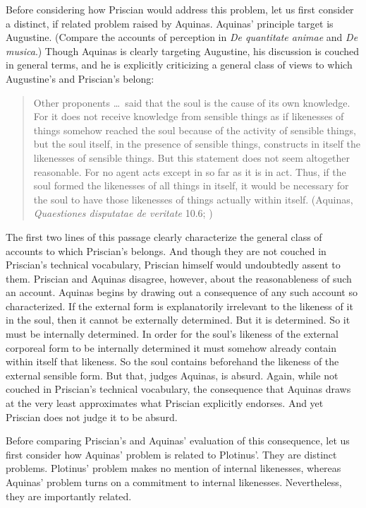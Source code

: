 \documentclass[12pt]{article}
\begin{document}
Before considering how Priscian would address this problem, let us first consider a distinct, if related problem raised by Aquinas. Aquinas' principle target is Augustine. (Compare the accounts of perception in \emph{De quantitate animae} and \emph{De musica}.) Though Aquinas is clearly targeting Augustine, his discussion is couched in general terms, and he is explicitly criticizing a general class of views to which Augustine's and Priscian's belong:
\begin{quote}
	Other proponents \ldots\ said that the soul is the cause of its own knowledge. For it does not receive knowledge from sensible things as if likenesses of things somehow reached the soul because of the activity of sensible things, but the soul itself, in the presence of sensible things, constructs in itself the likenesses of sensible things. But this statement does not seem altogether reasonable. For no agent acts except in so far as it is in act. Thus, if the soul formed the likenesses of all things in itself, it would be necessary for the soul to have those likenesses of things actually within itself. (Aquinas, \emph{Quaestiones disputatae de veritate} 10.6; \citealt[24]{James-V.-McGlynn:1953rz})
\end{quote}
The first two lines of this passage clearly characterize the general class of accounts to which Priscian's belongs. And though they are not couched in Priscian's technical vocabulary, Priscian himself would undoubtedly assent to them. Priscian and Aquinas disagree, however, about the reasonableness of such an account. Aquinas begins by drawing out a consequence of any such account so characterized. If the external form is explanatorily irrelevant to the likeness of it in the soul, then it cannot be externally determined. But it is determined. So it must be internally determined. In order for the soul's likeness of the external corporeal form to be internally determined it must somehow already contain within itself that likeness. So the soul contains beforehand the likeness of the external sensible form. But that, judges Aquinas, is absurd. Again, while not couched in Priscian's technical vocabulary, the consequence that Aquinas draws at the very least approximates what Priscian explicitly endorses. And yet Priscian does not judge it to be absurd.

Before comparing Priscian's and Aquinas' evaluation of this consequence, let us first consider how Aquinas' problem is related to Plotinus'. They are distinct problems. Plotinus' problem makes no mention of internal likenesses, whereas Aquinas' problem turns on a commitment to internal likenesses. Nevertheless, they are importantly related. 
\end{document}
